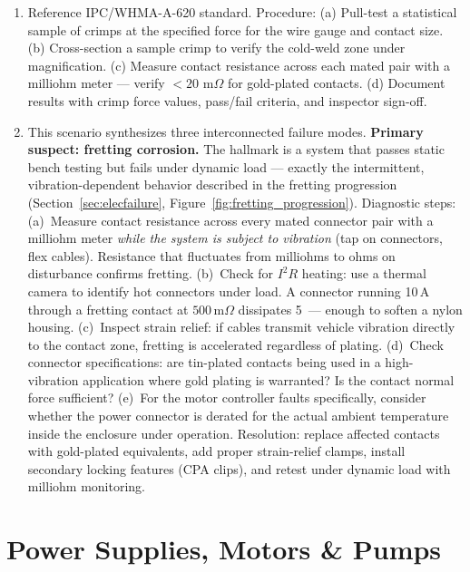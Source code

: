\documentclass[11pt,letterpaper,twoside,openany]{book}
\newcommand{\mohm}{\,\text{m}\Omega}
\begin{document}
\begin{enumerate}[leftmargin=1.5em]
  \item Reference IPC/WHMA-A-620 standard. Procedure: (a) Pull-test a statistical sample of crimps at the specified force for the wire gauge and contact size. (b) Cross-section a sample crimp to verify the cold-weld zone under magnification. (c) Measure contact resistance across each mated pair with a milliohm meter --- verify $<20\,\mohm$ for gold-plated contacts. (d) Document results with crimp force values, pass/fail criteria, and inspector sign-off.

  \item This scenario synthesizes three interconnected failure modes. \textbf{Primary suspect: fretting corrosion.} The hallmark is a system that passes static bench testing but fails under dynamic load --- exactly the intermittent, vibration-dependent behavior described in the fretting progression (Section~\ref{sec:elecfailure}, Figure~\ref{fig:fretting_progression}). Diagnostic steps: (a)~Measure contact resistance across every mated connector pair with a milliohm meter \emph{while the system is subject to vibration} (tap on connectors, flex cables). Resistance that fluctuates from milliohms to ohms on disturbance confirms fretting. (b)~Check for $I^2R$ heating: use a thermal camera to identify hot connectors under load. A connector running 10\,A through a fretting contact at $500\mohm$ dissipates 5\, --- enough to soften a nylon housing. (c)~Inspect strain relief: if cables transmit vehicle vibration directly to the contact zone, fretting is accelerated regardless of plating. (d)~Check connector specifications: are tin-plated contacts being used in a high-vibration application where gold plating is warranted? Is the contact normal force sufficient? (e)~For the motor controller faults specifically, consider whether the power connector is derated for the actual ambient temperature inside the enclosure under operation. Resolution: replace affected contacts with gold-plated equivalents, add proper strain-relief clamps, install secondary locking features (CPA clips), and retest under dynamic load with milliohm monitoring.
\end{enumerate}



\FloatBarrier
\chapter{Power Supplies, Motors \& Pumps}
\end{document}
